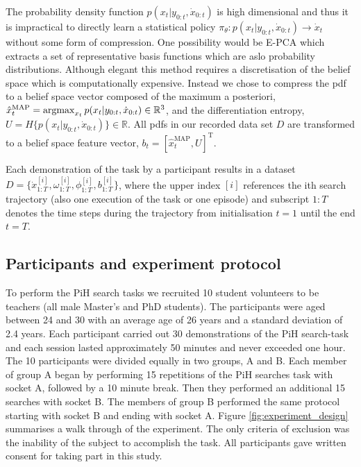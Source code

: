 The probability density function $p(x_t|y_{0:t},\dot{x}_{0:t})$ is high dimensional and thus it is 
impractical to directly learn a statistical policy $\pi_{\theta} : p(x_t|y_{0:t},\dot{x}_{0:t}) \rightarrow \dot{x}_t$
without some form of compression. One possibility would be E-PCA \cite{NIPS2002_2319} which extracts a set of 
representative basis functions which are aslo probability distributions. Although elegant this method 
requires a discretisation of the belief space which is computationally expensive. Instead we chose to 
compress the pdf to a belief space vector composed of the maximum a posteriori, $\hat{x}^{\mathrm{MAP}}_t = \argmax_{x_t} p(x_t|y_{0:t},\dot{x}_{0:t}) \in \mathbb{R}^3$, and the differentiation entropy, 
$U = H\{p(x_t|y_{0:t},\dot{x}_{0:t})\} \in \mathbb{R}$. All pdfs in our recorded data set $D$ are transformed to 
a belief space feature vector, $b_t = [\hat{x}^{\mathrm{MAP}}_t,U]^{\mathrm{T}}$. 

Each demonstration of the task by a participant results in a dataset $D=\{\dot{x}^{[i]}_{1:T},\omega^{[i]}_{1:T},\phi^{[i]}_{1:T},b^{[i]}_{1:T}\}$, 
where the upper index $[i]$ references the ith search trajectory (also one execution of the task or one episode) and 
subscript $1:T$ denotes the time steps during the trajectory from initialisation $t=1$ until the end $t=T$. 

\subsection{Participants and experiment protocol}

To perform the PiH search tasks we recruited 10 student volunteers to be teachers (all male Master's and PhD students).
The participants were aged between 24 and 30 with an average age of 26 years and a standard deviation of 2.4 years.
Each participant carried out 30 demonstrations of the PiH search-task and each session lasted approximately 50 minutes and 
never exceeded one hour. The 10 participants were divided equally in two groups, A and B. Each member of group A began 
by performing 15 repetitions of the PiH searches task with socket A, followed by a 10 minute break. Then they performed an 
additional 15 searches with socket B. The members of group B performed the same protocol starting with socket B and ending
with socket A.
Figure \ref{fig:experiment_design} summarises a walk through of the experiment.
The only criteria of exclusion was the inability of the subject to accomplish the task. All participants gave written consent 
for taking part in this study.

